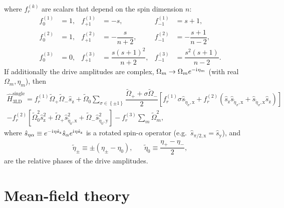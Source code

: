 \documentclass[aps,pra,nofootinbib,twocolumn,superscriptaddress]{revtex4-2}
\renewcommand{\t}{\text} %
\newcommand{\f}[2]{\dfrac{#1}{#2}} %
\newcommand{\p}[1]{\left(#1\right)} %
\renewcommand{\sp}[1]{\left[#1\right]} %
\renewcommand{\set}[1]{\left\{#1\right\}} %
\renewcommand{\i}{\mathrm{i}\mkern1mu} %
\newcommand{\1}{\mathds{1}}
\newcommand{\s}{\hat{s}}
\renewcommand{\H}{\hat{H}}
\newcommand{\x}{\text{x}}
\newcommand{\y}{\text{y}}
\newcommand{\z}{\text{z}}
\begin{document}
where $f_r^{(k)}$ are scalars that depend on the spin dimension $n$:
\begin{align}
  f_0^{(1)} &= 1, &
  f_{+1}^{(1)} &= -s, &
  f_{-1}^{(1)} &= s+1, \\
  f_0^{(2)} &= 1, &
  f_{+1}^{(2)} &= -\f{s}{n+2}, &
  f_{-1}^{(2)} &= -\f{s+1}{n-2}, \\
  f_0^{(3)} &= 0, &
  f_{+1}^{(3)} &= \f{s(s+1)^2}{n+2}, &
  f_{-1}^{(3)} &= \f{s^2(s+1)}{n-2}.
\end{align}
If additionally the drive amplitudes are complex, $\Omega_m\to\Omega_me^{-\i\eta_m}$ (with real $\Omega_m,\eta_m$), then
\begin{multline}
  \H_{\t{3LD}}^{\t{single}}
  = f_r^{(1)} \tilde\Omega_+ \tilde\Omega_- \s_\z
  + \tilde\Omega_0 \sum_{\sigma\in\set{\pm1}}
  \f{\tilde\Omega_+ + \sigma\tilde\Omega_-}{2}
  \sp{f_r^{(1)} \sigma \s_{\tilde\eta_\sigma,\x}
    + f_r^{(2)} \p{\s_\z \s_{\tilde\eta_\sigma,\x}
      + \s_{\tilde\eta_\sigma,\x} \s_\z}} \\
  - f_r^{(2)} \sp{\tilde\Omega_0^2 \s_\z^2
    + \tilde\Omega_+ \s_{\tilde\eta_0,\x}^2
    + \tilde\Omega_- \s_{\tilde\eta_0,\y}^2}
  - f_r^{(3)} \sum_m \tilde\Omega_m^2,
\end{multline}
where $\s_{\eta\alpha} \equiv e^{-\i\eta \s_\z} \s_\alpha e^{\i\eta \s_\z}$ is a rotated spin-$\alpha$ operator (e.g.~$\s_{\pi/2,\x}=\s_\y$), and
\begin{align}
  \tilde\eta_\pm \equiv \pm \p{\eta_\pm - \eta_0},
  &&
  \tilde\eta_0 \equiv \f{\eta_+ - \eta_-}{2},
\end{align}
are the relative phases of the drive amplitudes.

\section{Mean-field theory}
\label{sec:MFT}
\end{document}
